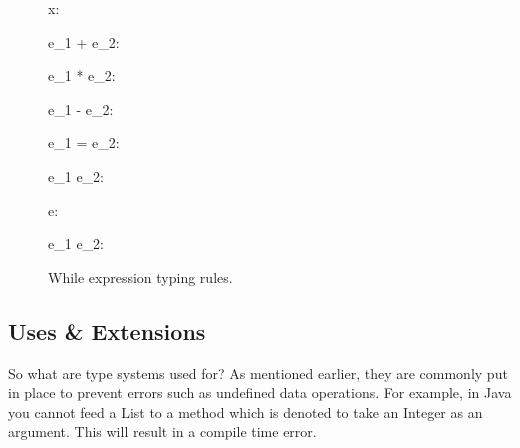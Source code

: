 \begin{figure}[]
  \begin{multicols}{3}


  \end{multicols}

  \RuleSpace

  {\Gamma \vdash x: \tau}

  \RuleSpace

  {\Gamma \vdash e_1 + e_2: \WhInt}

  \RuleSpace

  {\Gamma \vdash e_1 * e_2: \WhInt}

  \RuleSpace

  {\Gamma \vdash e_1 - e_2: \WhInt}

  \RuleSpace 

  {\Gamma \vdash e_1 = e_2: \WhBool}

  \RuleSpace 

  {\Gamma \vdash e_1 \leq e_2: \WhBool}

  \RuleSpace

  {\Gamma \vdash \lnot e: \WhBool}

  \RuleSpace 

  {\Gamma \vdash e_1 \land e_2: \WhBool}

  \caption{While expression typing rules.}
  \label{fig:while_expr_tpe}
\end{figure}


\subsection{Uses \& Extensions}
\label{sub:uses_and_extensions}

So what are type systems used for? As mentioned earlier, they are commonly put
in place to prevent errors such as undefined data operations. For example, in
Java you cannot feed a List to a method which is denoted to take an Integer as
an argument. This will result in a compile time error.

